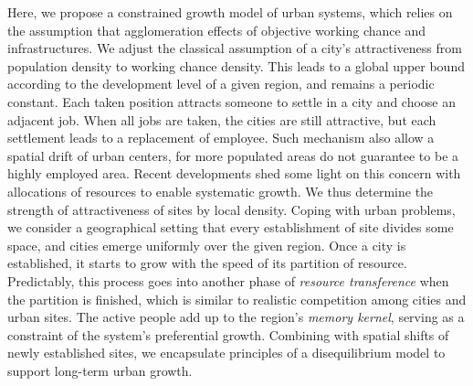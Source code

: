 \documentclass[reprint,unsortedaddress,amsmath,amssymb,aps,prl,showkeys]{revtex4-2}
\begin{document}
Here, we propose a constrained growth model of urban systems, which relies on the assumption that agglomeration effects of objective working chance and infrastructures. We adjust the classical assumption of a city's attractiveness from population density to working chance density. This leads to a global upper bound according to the development level of a given region, and remains a periodic constant. Each taken position attracts someone to settle in a city and choose an adjacent job. When all jobs are taken, the cities are still attractive, but each settlement leads to a replacement of employee. Such mechanism also allow a spatial drift of urban centers, for more populated areas do not guarantee to be a highly employed area. Recent developments shed some light on this concern with allocations of resources to enable systematic growth\cite{schaigorodsky2018short}. We thus determine the strength of attractiveness of sites by local density. Coping with urban problems, we consider a geographical setting that every establishment of site divides some space, and cities emerge uniformly over the given region. Once a city is established, it starts to grow with the speed of its partition of resource. Predictably, this process goes into another phase of \emph{resource transference} when the partition is finished, which is similar to realistic competition among cities and urban sites. The active people add up to the region's \emph{memory kernel}, serving as a constraint of the system's preferential growth\cite{PhysRevE.97.022132}. Combining with spatial shifts of newly established sites, we encapsulate principles of a disequilibrium model to support long-term urban growth. 
\end{document}
